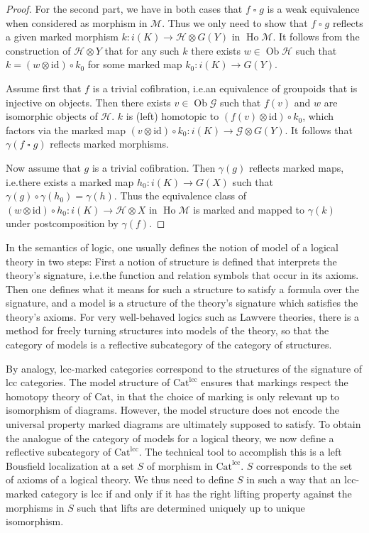 \documentclass[a4paper]{article}
\theoremstyle{remark}
\theoremstyle{definition}
\begin{document}
\begin{proof}
  For the second part, we have in both cases that $f \mathbin{\square} g$ is a weak equivalence when considered as morphism in $\mathcal{M}$.
  Thus we only need to show that $f \mathbin{\square} g$ reflects a given marked morphism $k : i(K) \rightarrow \mathcal{H} \otimes G(Y)$ in $\operatorname{Ho} \mathcal{M}$.
  It follows from the construction of $\mathcal{H} \otimes Y$ that for any such $k$ there exists $w \in \operatorname{Ob} \mathcal{H}$ such that $k = (w \otimes \mathrm{id}) \circ k_0$ for some marked map $k_0 : i(K) \rightarrow G(Y)$.

  Assume first that $f$ is a trivial cofibration, i.e.\@ an equivalence of groupoids that is injective on objects.
  Then there exists $v \in \operatorname{Ob} \mathcal{G}$ such that $f(v)$ and $w$ are isomorphic objects of $\mathcal{H}$.
  $k$ is (left) homotopic to $(f(v) \otimes \mathrm{id}) \circ k_0$, which factors via the marked map $(v \otimes \mathrm{id}) \circ k_0 : i(K) \rightarrow \mathcal{G} \otimes G(Y)$.
  It follows that $\gamma(f \mathbin{\square} g)$ reflects marked morphisms.

  Now assume that $g$ is a trivial cofibration.
  Then $\gamma(g)$ reflects marked maps, i.e.\@ there exists a marked map $h_0 : i(K) \rightarrow G(X)$ such that $\gamma(g) \circ \gamma(h_0) = \gamma(h)$.
  Thus the equivalence class of $(w \otimes \mathrm{id}) \circ h_0 : i(K) \rightarrow \mathcal{H} \otimes X$ in $\operatorname{Ho} \mathcal{M}$ is marked and mapped to $\gamma(k)$ under postcomposition by $\gamma(f)$.
\end{proof}

In the semantics of logic, one usually defines the notion of model of a logical theory in two steps:
First a notion of structure is defined that interprets the theory's signature, i.e.\@ the function and relation symbols that occur in its axioms.
Then one defines what it means for such a structure to satisfy a formula over the signature, and a model is a structure of the theory's signature which satisfies the theory's axioms.
For very well-behaved logics such as Lawvere theories, there is a method for freely turning structures into models of the theory, so that the category of models is a reflective subcategory of the category of structures.

By analogy, lcc-marked categories correspond to the structures of the signature of lcc categories.
The model structure of $\mathrm{Cat}^{\mathrm{lcc}}$ ensures that markings respect the homotopy theory of $\mathrm{Cat}$, in that the choice of marking is only relevant up to isomorphism of diagrams.
However, the model structure does not encode the universal property marked diagrams are ultimately supposed to satisfy.
To obtain the analogue of the category of models for a logical theory, we now define a reflective subcategory of $\mathrm{Cat}^{\mathrm{lcc}}$.
The technical tool to accomplish this is a left Bousfield localization at a set $S$ of morphism in $\mathrm{Cat}^{\mathrm{lcc}}$.
$S$ corresponds to the set of axioms of a logical theory.
We thus need to define $S$ in such a way that an lcc-marked category is lcc if and only if it has the right lifting property against the morphisms in $S$ such that lifts are determined uniquely up to unique isomorphism.
\end{document}

